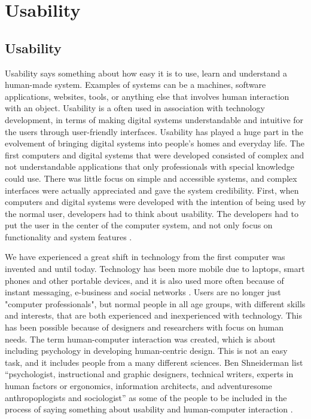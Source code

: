 \chapter{Usability}
\section{Usability}
Usability says something about how easy it is to use, learn and understand a human-made system. Examples of systems can be a machines, software applications, websites, tools, or anything else that involves human interaction with an object. Usability is a often used in association with technology development, in terms of making digital systems understandable and intuitive for the users through user-friendly interfaces. Usability has played a huge part in the evolvement of bringing digital systems into people’s homes and everyday life. The first computers and digital systems that were developed consisted of complex and not understandable applications that only professionals with special knowledge could use. There was little focus on simple and accessible systems, and complex interfaces were actually appreciated and gave the system credibility. First, when computers and digital systems were developed with the intention of being used by the normal user, developers had to think about usability. The developers had to put the user in the center of the computer system, and not only focus on functionality and system features \cite{mmi}.

We have experienced a great shift in technology from the first computer was invented and until today. Technology has been more mobile due to laptops, smart phones and other portable devices, and it is also used more often because of instant messaging, e-business and social networks \cite{mmi}. Users are no longer just "computer professionals", but normal people in all age groups, with different skills and interests, that are both experienced and inexperienced with technology. This has been possible because of designers and researchers with focus on human needs. The term human-computer interaction was created, which is about including psychology in developing human-centric design. This is not an easy task, and it includes people from a many different sciences. Ben Shneiderman list “psychologist, instructional and graphic designers, technical writers, experts in human factors or ergonomics, information architects, and adventuresome anthropoplogists and sociologist” as some of the people to be included in the process of saying something about usability and human-computer interaction \cite{mmi}.  

